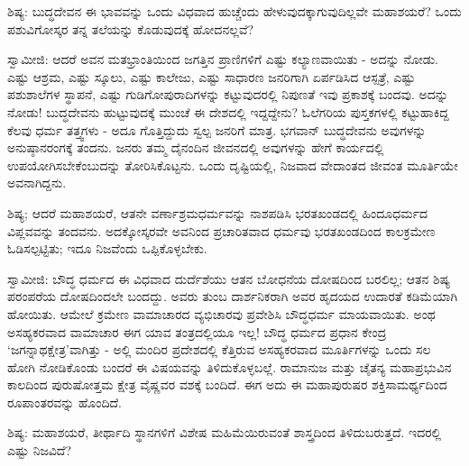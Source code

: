 ಶಿಷ್ಯ: ಬುದ್ಧದೇವನ ಈ ಭಾವವನ್ನು ಒಂದು ವಿಧವಾದ ಹುಚ್ಚೆಂದು ಹೇಳುವುದಕ್ಕಾಗುವುದಿಲ್ಲವೇ ಮಹಾಶಯರೆ? ಒಂದು ಪಶುವಿಗೋಸ್ಕರ ತನ್ನ ತಲೆಯನ್ನು ಕೊಡುವುದಕ್ಕೆ ಹೋದನಲ್ಲವೆ?

ಸ್ವಾಮೀಜಿ: ಆದರೆ ಅವನ ಮತಭ್ರಾಂತಿಯಿಂದ ಜಗತ್ತಿನ ಪ್ರಾಣಿಗಳಿಗೆ ಎಷ್ಟು ಕಲ್ಯಾಣವಾಯಿತು - ಅದನ್ನು ನೋಡು. ಎಷ್ಟು ಆಶ್ರಮ, ಎಷ್ಟು ಸ್ಕೂಲು, ಎಷ್ಟು ಕಾಲೇಜು, ಎಷ್ಟು ಸಾಧಾರಣ ಜನರಿಗಾಗಿ ಏರ್ಪಡಿಸಿದ ಆಸ್ಪತ್ರೆ, ಎಷ್ಟು ಪಶುಶಾಲೆಗಳ ಸ್ಥಾಪನೆ, ಎಷ್ಟು ಗುಡಿಗೋಪುರಾದಿಗಳನ್ನು ಕಟ್ಟುವುದರಲ್ಲಿ ನಿಪುಣತೆ ಇವು ಪ್ರಕಾಶಕ್ಕೆ ಬಂದವು. ಅದನ್ನು ನೋಡು! ಬುದ್ಧದೇವನು ಹುಟ್ಟುವುದಕ್ಕೆ ಮುಂಚೆ ಈ ದೇಶದಲ್ಲಿ ಇದ್ದದ್ದೇನು? ಓಲೆಗರಿಯ ಪುಸ್ತಕಗಳಲ್ಲಿ ಕಟ್ಟುಹಾಕಿದ್ದ ಕೆಲವು ಧರ್ಮ ತತ್ತ್ವಗಳು - ಅದೂ ಗೊತ್ತಿದ್ದುದು ಸ್ವಲ್ಪ ಜನರಿಗೆ ಮಾತ್ರ. ಭಗವಾನ್ ಬುದ್ಧದೇವನು ಅವುಗಳನ್ನು ಅನುಷ್ಠಾನರಂಗಕ್ಕೆ ತಂದನು. ಜನರು ತಮ್ಮ ದೈನಂದಿನ ಜೀವನದಲ್ಲಿ ಅವುಗಳನ್ನು ಹೇಗೆ ಕಾರ್ಯದಲ್ಲಿ ಉಪಯೋಗಿಸಬೇಕೆಂಬುದನ್ನು ತೋರಿಸಿಕೊಟ್ಟನು. ಒಂದು ದೃಷ್ಟಿಯಲ್ಲಿ, ನಿಜವಾದ ವೇದಾಂತದ ಜೀವಂತ ಮೂರ್ತಿಯೇ ಅವನಾಗಿದ್ದನು.

ಶಿಷ್ಯ; ಆದರೆ ಮಹಾಶಯರೆ, ಆತನೇ ವರ್ಣಾಶ್ರಮಧರ್ಮವನ್ನು ನಾಶಪಡಿಸಿ ಭರತಖಂಡದಲ್ಲಿ ಹಿಂದೂಧರ್ಮದ ವಿಪ್ಲವವನ್ನು ತಂದವನು. ಅದಕ್ಕೋಸ್ಕರವೇ ಅವನಿಂದ ಪ್ರಚಾರಿತವಾದ ಧರ್ಮವು ಭರತಖಂಡದಿಂದ ಕಾಲಕ್ರಮೇಣ ಓಡಿಸಲ್ಪಟ್ಟಿತು; ಇದೂ ನಿಜವೆಂದು ಒಪ್ಪಿಕೊಳ್ಳಬೇಕು.

ಸ್ವಾಮೀಜಿ: ಬೌದ್ಧ ಧರ್ಮದ ಈ ವಿಧವಾದ ದುರ್ದೆಶೆಯು ಆತನ ಬೋಧನೆಯ ದೋಷದಿಂದ ಬರಲಿಲ್ಲ; ಆತನ ಶಿಷ್ಯ ಪರಂಪರೆಯ ದೋಷದಿಂದಲೇ ಬಂದದ್ದು. ಅವರು ತುಂಬ ದಾರ್ಶನಿಕರಾಗಿ ಅವರ ಹೃದಯದ ಉದಾರತೆ ಕಡಿಮೆಯಾಗಿ ಹೋಯಿತು. ಆಮೇಲೆ ಕ್ರಮೇಣ ವಾಮಾಚಾರದ ವ್ಯಭಿಚಾರವು ಪ್ರವೇಶಿಸಿ ಬೌದ್ಧಧರ್ಮ ಮಾಯವಾಯಿತು. ಅಂಥ ಅಸಹ್ಯಕರವಾದ ವಾಮಾಚಾರ ಈಗ ಯಾವ ತಂತ್ರದಲ್ಲಿಯೂ ಇಲ್ಲ! ಬೌದ್ಧ ಧರ್ಮದ ಪ್ರಧಾನ ಕೇಂದ್ರ ‘ಜಗನ್ನಾಥಕ್ಷೇತ್ರ’ವಾಗಿತ್ತು - ಅಲ್ಲಿ ಮಂದಿರ ಪ್ರದೇಶದಲ್ಲಿ ಕೆತ್ತಿರುವ ಅಸಹ್ಯಕರವಾದ ಮೂರ್ತಿಗಳನ್ನು ಒಂದು ಸಲ ಹೋಗಿ ನೋಡಿಕೊಂಡು ಬಂದರೆ ಈ ವಿಷಯವನ್ನು ತಿಳಿದುಕೊಳ್ಳಬಲ್ಲೆ. ರಾಮಾನುಜ ಮತ್ತು ಚೈತನ್ಯ ಮಹಾಪ್ರಭುವಿನ ಕಾಲದಿಂದ ಪುರುಷೋತ್ತಮ ಕ್ಷೇತ್ರ ವೈಷ್ಣವರ ವಶಕ್ಕೆ ಬಂದಿದೆ. ಈಗ ಅದು ಈ ಮಹಾಪುರುಷರ ಶಕ್ತಿಸಾಮರ್ಥ್ಯದಿಂದ ರೂಪಾಂತರವನ್ನು ಹೊಂದಿದೆ.

ಶಿಷ್ಯ: ಮಹಾಶಯರೆ, ತೀರ್ಥಾದಿ ಸ್ಥಾನಗಳಿಗೆ ವಿಶೇಷ ಮಹಿಮೆಯಿರುವಂತೆ ಶಾಸ್ತ್ರದಿಂದ ತಿಳಿದುಬರುತ್ತದೆ. ಇದರಲ್ಲಿ ಎಷ್ಟು ನಿಜವಿದೆ?

